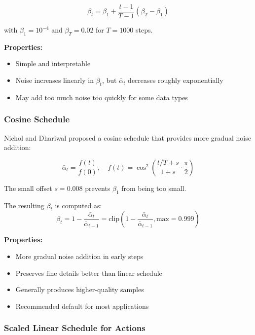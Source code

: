 \begin{equation}
\beta_t = \beta_1 + \frac{t-1}{T-1}(\beta_T - \beta_1)
\label{eq:linear_schedule_detailed}
\end{equation}

with $\beta_1 = 10^{-4}$ and $\beta_T = 0.02$ for $T = 1000$ steps.

\textbf{Properties:}
\begin{itemize}
    \item Simple and interpretable
    \item Noise increases linearly in $\beta_t$, but $\bar{\alpha}_t$ decreases roughly exponentially
    \item May add too much noise too quickly for some data types
\end{itemize}

\subsubsection{Cosine Schedule}

Nichol and Dhariwal proposed a cosine schedule that provides more gradual noise addition:

\begin{equation}
\bar{\alpha}_t = \frac{f(t)}{f(0)}, \quad f(t) = \cos^2\left(\frac{t/T + s}{1+s} \cdot \frac{\pi}{2}\right)
\label{eq:cosine_schedule_detailed}
\end{equation}

The small offset $s = 0.008$ prevents $\beta_1$ from being too small.

The resulting $\beta_t$ is computed as:
\begin{equation}
\beta_t = 1 - \frac{\bar{\alpha}_t}{\bar{\alpha}_{t-1}} = \text{clip}\left(1 - \frac{\bar{\alpha}_t}{\bar{\alpha}_{t-1}}, \text{max}=0.999\right)
\label{eq:beta_from_alpha_bar}
\end{equation}

\textbf{Properties:}
\begin{itemize}
    \item More gradual noise addition in early steps
    \item Preserves fine details better than linear schedule
    \item Generally produces higher-quality samples
    \item Recommended default for most applications
\end{itemize}

\subsubsection{Scaled Linear Schedule for Actions}

